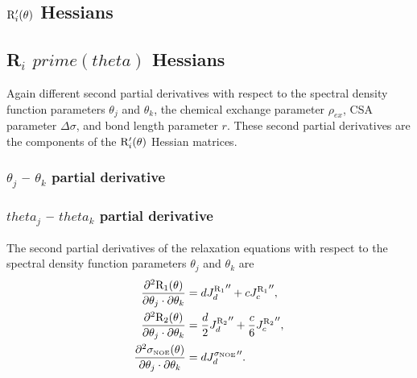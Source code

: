 
\begin{latexonly}
    \subsection{$\mathrm{R}_i'(\theta)$ Hessians}
\end{latexonly}
\begin{htmlonly}
    \subsection{R$_i$ $prime(theta)$ Hessians}
\end{htmlonly}

Again different second partial derivatives with respect to the spectral density function parameters $\theta_j$ and $\theta_k$, the chemical exchange parameter $\rho_{ex}$, CSA parameter $\Delta\sigma$, and bond length parameter $r$.  These second partial derivatives are the components of the $\mathrm{R}_i'(\theta)$ Hessian matrices.


\begin{latexonly}
    \subsubsection{$\theta_j$ -- $\theta_k$ partial derivative}
\end{latexonly}
\begin{htmlonly}
    \subsubsection{$theta_j$ -- $theta_k$ partial derivative}
\end{htmlonly}

The second partial derivatives of the relaxation equations with respect to the spectral density function parameters $\theta_j$ and $\theta_k$ are
\begin{subequations}
\begin{align}
    \frac{\partial^2 \mathrm{R}_1(\theta)}{\partial \theta_j \cdot \partial \theta_k} &= d {J_d^{\mathrm{R}_1}}'' + c {J_c^{\mathrm{R}_1}}'',                      \label{eq: Ri': d2R1/dmfj.dmfk} \\
    \frac{\partial^2 \mathrm{R}_2(\theta)}{\partial \theta_j \cdot \partial \theta_k} &= \frac{d}{2} {J_d^{\mathrm{R}_2}}'' + \frac{c}{6} {J_c^{\mathrm{R}_2}}'',  \label{eq: Ri': d2R2/dmfj.dmfk} \\
    \frac{\partial^2 \sigma_{\scriptscriptstyle \mathrm{NOE}}(\theta)}{\partial \theta_j \cdot \partial \theta_k} &= d {J_d^{\sigma_{\scriptscriptstyle \mathrm{NOE}}}}''.                          \label{eq: Ri': d2sigmaNOE/dmfj.dmfk}
\end{align}
\end{subequations}


